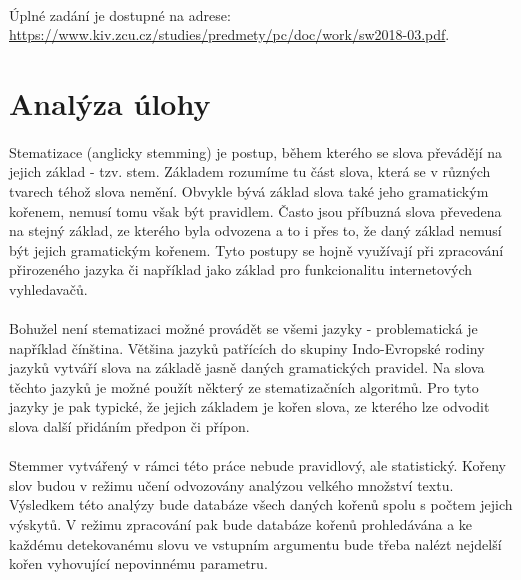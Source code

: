 ﻿\documentclass[12pt, a4paper]{article}
\begin{document}
\paragraph{}
Úplné zadání je dostupné na adrese:\\ \href{https://www.kiv.zcu.cz/studies/predmety/pc/doc/work/sw2018-03.pdf}{https://www.kiv.zcu.cz/studies/predmety/pc/doc/work/sw2018-03.pdf}.


\section{Analýza úlohy}
\paragraph{}
Stematizace (anglicky stemming) je postup, během kterého se slova převádějí na jejich základ - tzv. stem. Základem rozumíme tu část slova, která se v různých tvarech téhož slova nemění. Obvykle bývá základ slova také jeho gramatickým kořenem, nemusí tomu však být pravidlem. Často jsou příbuzná slova převedena na stejný základ, ze kterého byla odvozena a to i přes to, že daný základ nemusí být jejich gramatickým kořenem. Tyto postupy se hojně využívají při zpracování přirozeného jazyka či například jako základ pro funkcionalitu internetových vyhledavačů.

\paragraph{}
Bohužel není stematizaci možné provádět se všemi jazyky - problematická je například čínština. Většina jazyků patřících do skupiny Indo-Evropské rodiny jazyků vytváří slova na základě jasně daných gramatických pravidel. Na slova těchto jazyků je možné použít některý ze stematizačních algoritmů. Pro tyto jazyky je pak typické, že jejich základem je kořen slova, ze kterého lze odvodit slova další přidáním předpon či přípon.

\paragraph{}
Stemmer vytvářený v rámci této práce nebude pravidlový, ale statistický. Kořeny slov budou v režimu učení odvozovány analýzou velkého množství textu. Výsledkem této analýzy bude databáze všech daných kořenů spolu s počtem jejich výskytů. V režimu zpracování pak bude databáze kořenů prohledávána a ke každému detekovanému slovu ve vstupním argumentu bude třeba nalézt nejdelší kořen vyhovující nepovinnému parametru.
\end{document}
